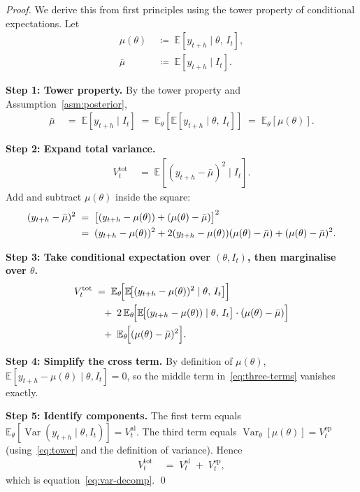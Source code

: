 \documentclass[12pt,openany]{book}
\newcommand{\calI}{\mathcal{I}}
\newcommand{\E}{\mathbb{E}}
\numberwithin{equation}{chapter}
\theoremstyle{plain}
\theoremstyle{definition}
\theoremstyle{remark}
\numberwithin{equation}{chapter}
\theoremstyle{plain}
\DeclareMathOperator{\Var}{Var}
\def\calI{I}%
\begin{document}
\begin{proof}
We derive this from first principles using the tower property of
conditional expectations.  Let
\begin{align}
  \mu(\theta) &\;\coloneqq\; \E[y_{t+h} \mid \theta,\, \calI_t],
  \label{eq:mu-theta}\\
  \bar\mu &\;\coloneqq\; \E[y_{t+h} \mid \calI_t].
  \label{eq:mu-bar}
\end{align}

\noindent\textbf{Step 1: Tower property.}
By the tower property and Assumption~\ref{asm:posterior},
\begin{align}
  \bar\mu
  &\;=\; \E[y_{t+h} \mid \calI_t]
   \;=\; \E_\theta\!\left[\E[y_{t+h} \mid \theta,\, \calI_t]\right]
   \;=\; \E_\theta[\mu(\theta)].
  \label{eq:tower}
\end{align}

\noindent\textbf{Step 2: Expand total variance.}
\begin{align}
  V^{\mathrm{tot}}_t
  &\;=\; \E\!\left[(y_{t+h} - \bar\mu)^2 \mid \calI_t\right].
  \label{eq:Vtot-expand}
\end{align}
Add and subtract $\mu(\theta)$ inside the square:
\begin{align}
  (y_{t+h} - \bar\mu)^2
  &\;=\;
  \bigl[(y_{t+h} - \mu(\theta)) + (\mu(\theta) - \bar\mu)\bigr]^2
  \notag\\
  &\;=\;
  (y_{t+h} - \mu(\theta))^2
  + 2(y_{t+h} - \mu(\theta))(\mu(\theta) - \bar\mu)
  + (\mu(\theta) - \bar\mu)^2.
  \label{eq:expand-sq}
\end{align}

\noindent\textbf{Step 3: Take conditional expectation over
$(\theta, \calI_t)$, then marginalise over $\theta$.}
\begin{align}
  V^{\mathrm{tot}}_t
  &\;=\;
  \E_\theta\!\Bigl[
    \E\!\bigl[(y_{t+h} - \mu(\theta))^2
    \mid \theta,\, \calI_t\bigr]
  \Bigr]
  \notag\\
  &\quad
  +\; 2\,\E_\theta\!\Bigl[
    \E\!\bigl[(y_{t+h}-\mu(\theta)) \mid \theta,\, \calI_t\bigr]
    \cdot (\mu(\theta) - \bar\mu)
  \Bigr]
  \notag\\
  &\quad
  +\; \E_\theta\!\Bigl[(\mu(\theta) - \bar\mu)^2\Bigr].
  \label{eq:three-terms}
\end{align}

\noindent\textbf{Step 4: Simplify the cross term.}
By definition of $\mu(\theta)$,
$\E[y_{t+h} - \mu(\theta) \mid \theta, \calI_t] = 0$, so the
middle term in~\eqref{eq:three-terms} vanishes exactly.

\noindent\textbf{Step 5: Identify components.}
The first term equals $\E_\theta[\Var(y_{t+h} \mid \theta, \calI_t)]
= V^{\mathrm{al}}_t$.  The third term equals
$\Var_\theta[\mu(\theta)] = V^{\mathrm{ep}}_t$ (using~\eqref{eq:tower}
and the definition of variance).  Hence
\begin{align}
  V^{\mathrm{tot}}_t
  &\;=\; V^{\mathrm{al}}_t \;+\; V^{\mathrm{ep}}_t,
  \label{eq:ltv-final}
\end{align}
which is equation~\eqref{eq:var-decomp}. \qed
\end{proof}
\end{document}

